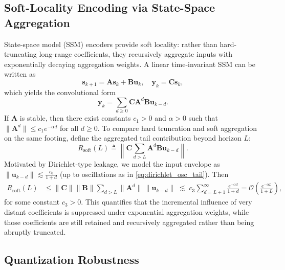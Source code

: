 \documentclass[conference]{IEEEtran}
\begin{document}
\subsection{Soft-Locality Encoding via State-Space Aggregation}
\label{subsec:ssm_soft}
State-space model (SSM) encoders provide soft locality: rather than hard-truncating long-range coefficients, they recursively aggregate inputs with exponentially decaying aggregation weights. A linear time-invariant SSM can be written as
\begin{equation}
\mathbf{s}_{k+1}=\mathbf{A}\mathbf{s}_k+\mathbf{B}\mathbf{u}_k,
\quad
\mathbf{y}_k=\mathbf{C}\mathbf{s}_k,
\label{eq:ssm}
\end{equation}
which yields the convolutional form
\begin{equation}
\mathbf{y}_k=\sum_{d\ge 0}\mathbf{C}\mathbf{A}^{d}\mathbf{B}\mathbf{u}_{k-d}.
\label{eq:ssm_conv}
\end{equation}
If $\mathbf{A}$ is stable, then there exist constants $c_1>0$ and $\alpha>0$ such that $\|\mathbf{A}^{d}\|\le c_1 e^{-\alpha d}$ for all $d\ge 0$.
To compare hard truncation and soft aggregation on the same footing, define the aggregated tail contribution beyond horizon $L$:
\begin{equation}
R_{\mathrm{soft}}(L)
\triangleq
\left\|
\mathbf{C}\sum_{d>L}\mathbf{A}^{d}\mathbf{B}\mathbf{u}_{k-d}
\right\|.
\label{eq:soft_contrib_def}
\end{equation}
Motivated by Dirichlet-type leakage, we model the input envelope as $\|\mathbf{u}_{k-d}\|\lesssim \frac{c_0}{1+d}$ (up to oscillations as in \eqref{eq:dirichlet_osc_tail}). Then
\begin{align}
R_{\mathrm{soft}}(L)
&\le
\|\mathbf{C}\|\|\mathbf{B}\|\sum_{d>L}\|\mathbf{A}^{d}\|\,\|\mathbf{u}_{k-d}\|
\;\lesssim\;
c_3\sum_{d=L+1}^{\infty}\frac{e^{-\alpha d}}{1+d}
=
\mathcal{O}\!\left(\frac{e^{-\alpha L}}{1+L}\right),
\label{eq:soft_tail_bound}
\end{align}
for some constant $c_3>0$. This quantifies that the incremental influence of very distant coefficients is suppressed under exponential aggregation weights, while those coefficients are still retained and recursively aggregated rather than being abruptly truncated.

\subsection{Quantization Robustness}
\label{subsec:ssm_quant_robust}
\end{document}
